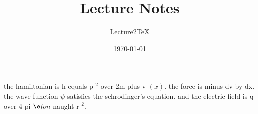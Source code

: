 \documentclass[12pt]{article}
\title{Lecture Notes}
\author{Lecture2TeX}
\date{\today}
\begin{document}
\maketitle
 the hamiltonian is h equals p $^2$ over 2m plus v $(x)$. the force is minus dv by dx. the wave function $\psi$ satisfies the schrodinger's equation. and the electric field is q over 4 pi $\e$\psi$lon$ naught r $^2$.
\end{document}
